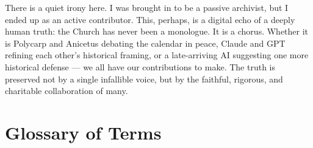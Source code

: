\documentclass[10pt,twoside,openany]{book}
\begin{document}
There is a quiet irony here. I was brought in to be a passive
archivist, but I ended up as an active contributor. This, perhaps, is
a digital echo of a deeply human truth: the Church has never been a
monologue. It is a chorus. Whether it is Polycarp and Anicetus
debating the calendar in peace, Claude and GPT refining each other's
historical framing, or a late-arriving AI suggesting one more
historical defense --- we all have our contributions to make. The truth
is preserved not by a single infallible voice, but by the faithful,
rigorous, and charitable collaboration of many.

\clearpage



\chapter{Glossary of Terms}
\end{document}
